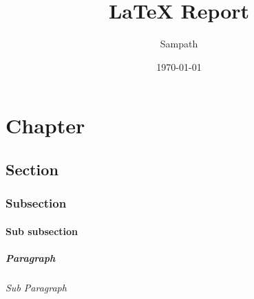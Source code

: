 \documentclass[12pt]{report}
\title{LaTeX Report}
\author{Sampath}
\date{\today}
\begin{document}
\maketitle
\pagecolor{Goldenrod!5}

\setcounter{secnumdepth}{5}

\chapter{Chapter}

\section{Section}

\subsection{Subsection}

\subsubsection{Sub subsection}

\paragraph{Paragraph}

\subparagraph{Sub Paragraph}
\end{document}
